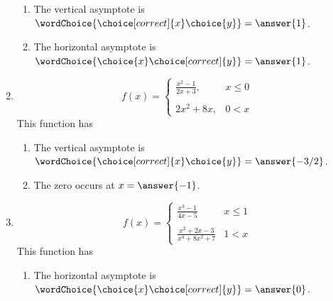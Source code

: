 \documentclass{ximera}
\begin{document}
\begin{exercise}
\begin{enumerate}
\begin{exercise}
\begin{enumerate}
\item The vertical asymptote is $\wordChoice{\choice[correct]{x}\choice{y}} = \answer{1}$.

\item The horizontal asymptote is $\wordChoice{\choice{x}\choice[correct]{y}} = \answer{1}$.
\end{enumerate}
\end{exercise}

\item \begin{equation*}
	f(x) = \begin{cases}
		\frac{x^2-1}{2x+3},  & x \leq 0 \\
		\\
		2x^2+8x,  & 0 < x 
		\end{cases}
		\end{equation*}
This function has
\begin{selectAll}
\end{selectAll}
%
\begin{exercise}
\begin{enumerate}
\item The vertical asymptote is $\wordChoice{\choice[correct]{x}\choice{y}} =\answer{-3/2}$.

\item The zero occurs at $x=\answer{-1}$.
\end{enumerate}
\end{exercise}

\item \begin{equation*}
	f(x) = \begin{cases}
		\frac{x^3-1}{4x-5}  & x \leq 1 \\
		\\
		\frac{x^2+2x -3}{x^4+8x^2+7}  & 1 < x
		\end{cases}
		\end{equation*}
This function has
\begin{selectAll}
\end{selectAll}
%
\begin{exercise}
\begin{enumerate}
\item The horizontal asymptote is $\wordChoice{\choice{x}\choice[correct]{y}} = \answer{0}$.


\end{enumerate}
\end{exercise}
\end{enumerate}
\end{exercise}
\end{document}
